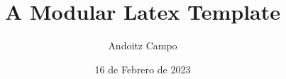 \documentclass[12pt]{article}
\title{A Modular Latex Template}
\author{Andoitz Campo}
\date{16 de Febrero de 2023}
\begin{document}
	

	\newpage
    \tableofcontents

	\newpage
    
    
    
    
    

	\newpage
	

	\newpage
	\nocite{*}
	
	

	\newpage
	
\end{document}
